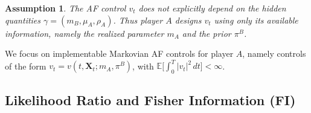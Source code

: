 \documentclass[letterpaper, 10 pt, conference]{ieeeconf}
\newcommand{\E}{\mathbb E}
\newtheorem{assumption}{Assumption}
\newcommand{\rh}[1]{\textcolor{purple}{\textsf{[RH: #1]}}}
\newcommand{\dr}[1]{\textcolor{red}{\textsf{[DR: #1]}}}
\begin{document}
\begin{assumption}\label{assu:AF}
The AF control \(v_t\) does not explicitly depend on the hidden quantities $\gamma = (m_B, \mu_A, \rho_A)$. Thus player \(A\) designs \(v_t\) using only its available information, namely the realized parameter \(m_A\) and the prior \(\pi^B\).
\end{assumption}

We  focus on implementable  Markovian AF controls for player \(A\), namely controls of the form $
v_t = v(t,\bm X_t; m_A,\pi^B)$, with
$\E\!\big[\int_0^T |v_t|^2\,dt\big] < \infty$.




\subsection{Likelihood Ratio and Fisher Information (FI)}
\end{document}
